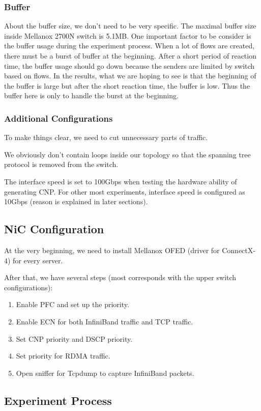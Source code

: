 \documentclass[12pt,a4paper]{article}
\begin{document}
\subsubsection{Buffer}
About the buffer size, we don't need to be very specific. The maximal buffer size inside Mellanox 2700N switch is 5.1MB.
One important factor to be consider is the buffer usage during the experiment process.
When a lot of flows are created, there must be a burst of buffer at the beginning.
After a short period of reaction time, the buffer usage should go down because the senders are limited by switch based on flows.
In the results, what we are hoping to see is that the beginning of the buffer is large but after the short reaction time, the buffer is low.
Thus the buffer here is only to handle the burst at the beginning.

\subsubsection{Additional Configurations}
To make things clear, we need to cut unnecessary parts of traffic.

We obviously don't contain loops inside our topology so that the spanning tree protocol is removed from the switch.

The interface speed is set to 100Gbps when testing the hardware ability of generating CNP.
For other most experiments, interface speed is configured as 10Gbps (reason is explained in later sections).

\subsection{NiC Configuration}
At the very beginning, we need to install Mellanox OFED (driver for ConnectX-4) for every server.

After that, we have several steps (most corresponds with the upper switch configurations):
\begin{enumerate}
	\item Enable PFC and set up the priority.
	\item Enable ECN for both InfiniBand traffic and TCP traffic.
	\item Set CNP priority and DSCP priority.
	\item Set priority for RDMA traffic.
	\item Open sniffer for Tcpdump to capture InfiniBand packets.
\end{enumerate}

\subsection{Experiment Process}
\end{document}
